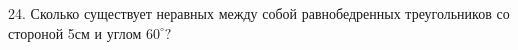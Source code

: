 24. Сколько существует неравных между собой равнобедренных треугольников со стороной 5см и углом $60^\circ ?$\\
